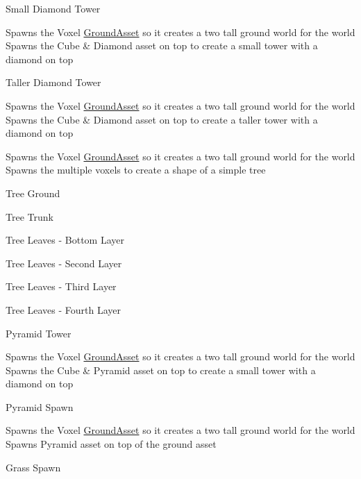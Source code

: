 Small Diamond Tower

Spawns the Voxel \hyperlink{classGroundAsset}{Ground\+Asset} so it creates a two tall ground world for the world Spawns the Cube \& Diamond asset on top to create a small tower with a diamond on top

Taller Diamond Tower

Spawns the Voxel \hyperlink{classGroundAsset}{Ground\+Asset} so it creates a two tall ground world for the world Spawns the Cube \& Diamond asset on top to create a taller tower with a diamond on top

Spawns the Voxel \hyperlink{classGroundAsset}{Ground\+Asset} so it creates a two tall ground world for the world Spawns the multiple voxels to create a shape of a simple tree

Tree Ground

Tree Trunk

Tree Leaves -\/ Bottom Layer

Tree Leaves -\/ Second Layer

Tree Leaves -\/ Third Layer

Tree Leaves -\/ Fourth Layer

Pyramid Tower

Spawns the Voxel \hyperlink{classGroundAsset}{Ground\+Asset} so it creates a two tall ground world for the world Spawns the Cube \& Pyramid asset on top to create a small tower with a diamond on top

Pyramid Spawn

Spawns the Voxel \hyperlink{classGroundAsset}{Ground\+Asset} so it creates a two tall ground world for the world Spawns Pyramid asset on top of the ground asset

Grass Spawn


